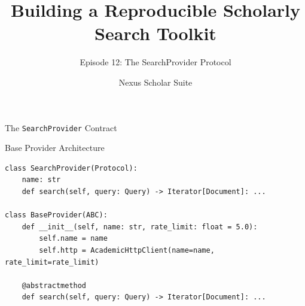\documentclass[aspectratio=169]{beamer}
\title{Building a Reproducible Scholarly Search Toolkit}
\subtitle{Episode 12: The SearchProvider Protocol}
\author{Nexus Scholar Suite}
\date{}
\begin{document}
\begin{frame}[plain]
  \titlepage
\end{frame}

\begin{frame}{The \texttt{SearchProvider} Contract}
  \begin{center}
  \end{center}
\end{frame}

\begin{frame}[fragile]{Base Provider Architecture}
\begin{lstlisting}[style=nexuspython]
class SearchProvider(Protocol):
    name: str
    def search(self, query: Query) -> Iterator[Document]: ...

class BaseProvider(ABC):
    def __init__(self, name: str, rate_limit: float = 5.0):
        self.name = name
        self.http = AcademicHttpClient(name=name, rate_limit=rate_limit)

    @abstractmethod
    def search(self, query: Query) -> Iterator[Document]: ...
\end{lstlisting}
\end{frame}
\end{document}
